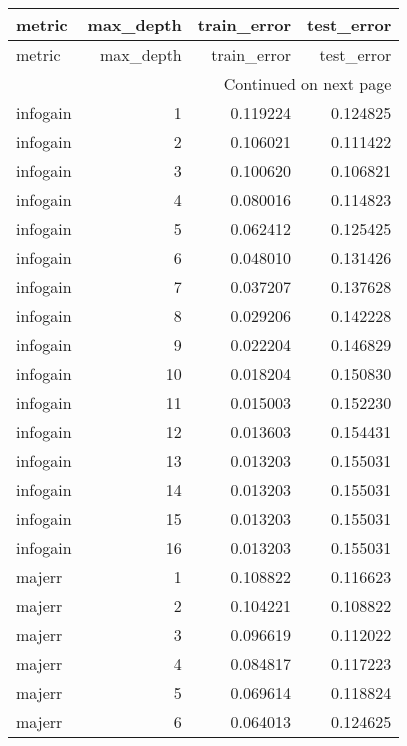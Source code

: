 \begin{longtable}{lrrr}
\toprule
  metric &  max\_depth &  train\_error &  test\_error \\
\midrule
\endfirsthead

\toprule
  metric &  max\_depth &  train\_error &  test\_error \\
\midrule
\endhead
\midrule
\multicolumn{4}{r}{{Continued on next page}} \\
\midrule
\endfoot

\bottomrule
\endlastfoot
infogain &          1 &     0.119224 &    0.124825 \\
infogain &          2 &     0.106021 &    0.111422 \\
infogain &          3 &     0.100620 &    0.106821 \\
infogain &          4 &     0.080016 &    0.114823 \\
infogain &          5 &     0.062412 &    0.125425 \\
infogain &          6 &     0.048010 &    0.131426 \\
infogain &          7 &     0.037207 &    0.137628 \\
infogain &          8 &     0.029206 &    0.142228 \\
infogain &          9 &     0.022204 &    0.146829 \\
infogain &         10 &     0.018204 &    0.150830 \\
infogain &         11 &     0.015003 &    0.152230 \\
infogain &         12 &     0.013603 &    0.154431 \\
infogain &         13 &     0.013203 &    0.155031 \\
infogain &         14 &     0.013203 &    0.155031 \\
infogain &         15 &     0.013203 &    0.155031 \\
infogain &         16 &     0.013203 &    0.155031 \\
  majerr &          1 &     0.108822 &    0.116623 \\
  majerr &          2 &     0.104221 &    0.108822 \\
  majerr &          3 &     0.096619 &    0.112022 \\
  majerr &          4 &     0.084817 &    0.117223 \\
  majerr &          5 &     0.069614 &    0.118824 \\
  majerr &          6 &     0.064013 &    0.124625 \\

\end{longtable}
